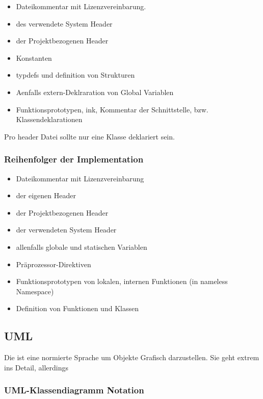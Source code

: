 \begin{itemize}[itemsep=1pt, parsep=0pt]
    \item Dateikommentar mit Lizenzvereinbarung.
    \item {} des verwendete System Header
    \item {} der Projektbezogenen Header
    \item Konstanten
    \item typdefs und definition von Strukturen
    \item Aenfalls extern-Deklraration von Global Variablen
    \item Funktionsprototypen, ink, Kommentar der Schnittstelle, bzw. Klassendeklarationen
\end{itemize}

Pro header Datei sollte nur eine Klasse deklariert sein.

\subsubsection{Reihenfolger der Implementation}

\begin{itemize}[itemsep=1pt, parsep=0pt]
    \item Dateikommentar mit Lizenzvereinbarung
    \item {} der eigenen Header
    \item {} der Projektbezogenen Header
    \item {} der verwendeten System Header
    \item allenfalls globale und statischen Variablen
    \item Präprozessor-Direktiven
    \item Funktionsprototypen von lokalen, internen Funktionen (in nameless Namespace)
    \item Definition von Funktionen und Klassen
\end{itemize}

\subsection{UML}

Die  ist eine normierte Sprache um Objekte Grafisch darzustellen. 
Sie geht extrem ins Detail, allerdings 

\subsubsection{UML-Klassendiagramm Notation}

